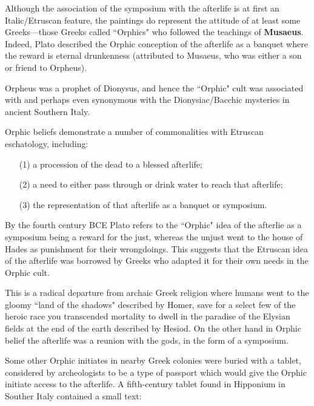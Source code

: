 Although the association of the symposium with the afterlife is at first an Italic/Etruscan feature, the paintings do represent the attitude of at least some Greeks---those Greeks called ``Orphics" who followed the teachings of \textbf{Musaeus}. Indeed, Plato described the Orphic conception of the afterlife as a banquet where the reward is eternal drunkenness (attributed to Musaeus, who was either a son or friend to Orpheus).

\begin{nte}
    Orpheus was a prophet of Dionysus, and hence the ``Orphic" cult was associated with and perhaps even synonymous with the Dionysiac/Bacchic mysteries in ancient Southern Italy.
\end{nte}

Orphic beliefs demonstrate a number of commonalities with Etruscan eschatology, including:

\begin{enumerate}
    \item[(1)] a procession of the dead to a blessed afterlife;
    \item[(2)] a need to either pass through or drink water to reach that afterlife;
    \item[(3)] the representation of that afterlife as a banquet or symposium.
\end{enumerate}

By the fourth century BCE Plato refers to the ``Orphic" idea of the afterlie as a symposium being a reward for the just, whereas the unjust went to the house of Hades as punishment for their wrongdoings. This suggests that the Etruscan idea of the afterlife was borrowed by Greeks who adapted it for their own needs in the Orphic cult.

\begin{rmk}
    This is a radical departure from archaic Greek religion where humans went to the gloomy ``land of the shadows" described by Homer, save for a select few of the heroic race you transcended mortality to dwell in the paradise of the Elysian fields at the end of the earth described by Hesiod. On the other hand in Orphic belief the afterlife was a reunion with the gods, in the form of a symposium.
\end{rmk}

Some other Orphic initiates in nearby Greek colonies were buried with a tablet, considered by archeologists to be a type of passport which would give the Orphic initiate access to the afterlife. A fifth-century tablet found in Hipponium in Souther Italy contained a small text:

